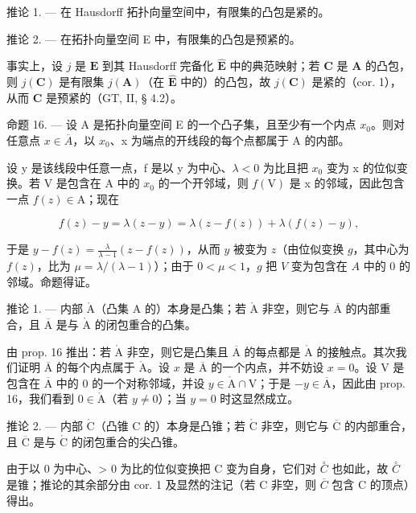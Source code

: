 推论 1. --- 在 Hausdorff 拓扑向量空间中，有限集的凸包是紧的。

推论 2. --- 在拓扑向量空间 E 中，有限集的凸包是预紧的。

事实上，设 \(j\) 是 \(\mathbf{E}\) 到其 Hausdorff 完备化 \(\hat{\mathbf{E}}\) 中的典范映射；若 \(\mathbf{C}\) 是 \(\mathbf{A}\) 的凸包，则 \(j(\mathbf{C})\) 是有限集 \(j(\mathbf{A})\)（在 \(\hat{\mathbf{E}}\) 中的）的凸包，故 \(j(\mathbf{C})\) 是紧的（cor. 1），从而 \(\mathbf{C}\) 是预紧的（GT, II, § 4.2）。

命题 16. --- 设 A 是拓扑向量空间 E 的一个凸子集，且至少有一个内点 \(x_{0}\)。则对任意点 \(x \in \overline{A}\)，以 \(x_{0}\)、x 为端点的开线段的每个点都属于 A 的内部。

设 y 是该线段中任意一点，f 是以 y 为中心、\(\lambda < 0\) 为比且把 \(x_{0}\) 变为 x 的位似变换。若 V 是包含在 A 中的 \(x_{0}\) 的一个开邻域，则 \(f(\mathrm{V})\) 是 x 的邻域，因此包含一点 \(f(z) \in \mathrm{A}\)；现在

\[
f (z) - y = \lambda (z - y) = \lambda (z - f (z)) + \lambda (f (z) - y),
\]

于是 \(y - f(z) = \frac{\lambda}{\lambda - 1} (z - f(z))\)，从而 \(y\) 被变为 \(z\)（由位似变换 \(g\)，其中心为 \(f(z)\)，比为 \(\mu = \lambda / (\lambda - 1)\)）；由于 \(0 < \mu < 1\)，\(g\) 把 \(V\) 变为包含在 \(A\) 中的 0 的邻域。命题得证。

推论 1. --- 内部 \(\mathring{\mathrm{A}}\)（凸集 \(\mathrm{A}\) 的）本身是凸集；若 \(\mathring{\mathrm{A}}\) 非空，则它与 \(\overline{\mathrm{A}}\) 的内部重合，且 \(\overline{\mathrm{A}}\) 是与 \(\mathring{\mathrm{A}}\) 的闭包重合的凸集。

由 prop. 16 推出：若 \(\mathring{\mathrm{A}}\) 非空，则它是凸集且 \(\overline{\mathrm{A}}\) 的每点都是 \(\mathring{\mathrm{A}}\) 的接触点。其次我们证明 \(\overline{\mathrm{A}}\) 的每个内点属于 \(\mathring{\mathrm{A}}\)。设 \(x\) 是 \(\overline{\mathrm{A}}\) 的一个内点，并不妨设 \(x = 0\)。设 \(\mathrm{V}\) 是包含在 \(\overline{\mathrm{A}}\) 中的 0 的一个对称邻域，并设 \(y \in \mathring{\mathrm{A}} \cap \mathrm{V}\)；于是 \(-y \in \overline{\mathrm{A}}\)，因此由 prop. 16，我们看到 \(0 \in \mathring{\mathrm{A}}\)（若 \(y \neq 0\)）；当 \(y = 0\) 时这显然成立。

推论 2. --- 内部 \(\mathring{\mathrm{C}}\)（凸锥 \(\mathrm{C}\) 的）本身是凸锥；若 \(\mathring{\mathrm{C}}\) 非空，则它与 \(\overline{\mathrm{C}}\) 的内部重合，且 \(\overline{\mathrm{C}}\) 是与 \(\mathring{\mathrm{C}}\) 的闭包重合的尖凸锥。

由于以 0 为中心、\textgreater{} 0 为比的位似变换把 C 变为自身，它们对 \(\overset{\circ}{C}\) 也如此，故 \(\overset{\circ}{C}\) 是锥；推论的其余部分由 cor. 1 及显然的注记（若 C 非空，则 \(\overline{C}\) 包含 C 的顶点）得出。

